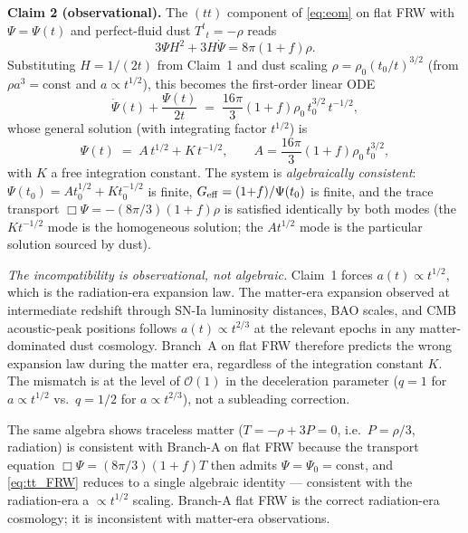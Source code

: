 \documentclass[aps,prd,twocolumn,nofootinbib,floatfix,superscriptaddress]{revtex4-2}
\begin{document}
\textbf{Claim 2 (observational).} The $(tt)$ component of
\eqref{eq:eom} on flat FRW with $\Psi = \Psi(t)$ and perfect-fluid
dust $T^t{}_t = -\rho$ reads
\begin{equation}
\label{eq:tt_FRW}
3\Psi H^2 + 3H\dot\Psi = 8\pi(1+f)\rho.
\end{equation}
Substituting $H = 1/(2t)$ from Claim~1 and dust scaling
$\rho = \rho_0(t_0/t)^{3/2}$ (from $\rho a^3 = \mathrm{const}$ and
$a\propto t^{1/2}$), this becomes the first-order linear ODE
\begin{equation}
\label{eq:psi_ode}
\dot\Psi(t) + \frac{\Psi(t)}{2t} \;=\; \frac{16\pi}{3}(1{+}f)\rho_0\,t_0^{3/2}\,t^{-1/2},
\end{equation}
whose general solution (with integrating factor $t^{1/2}$) is
\begin{equation}
\label{eq:psi_general}
\Psi(t) \;=\; A\,t^{1/2} + K\,t^{-1/2},
\qquad
A = \frac{16\pi}{3}(1{+}f)\rho_0\,t_0^{3/2},
\end{equation}
with $K$ a free integration constant. The system is
\emph{algebraically consistent}: $\Psi(t_0) = At_0^{1/2} + Kt_0^{-1/2}$
is finite, $G_{\rm eff} = (1{+}f)/\Psi(t_0)$ is finite, and the
trace transport $\Box\Psi = -(8\pi/3)(1{+}f)\rho$ is satisfied
identically by both modes (the $K t^{-1/2}$ mode is the
homogeneous solution; the $A t^{1/2}$ mode is the particular
solution sourced by dust).

\emph{The incompatibility is observational, not algebraic.}
Claim~1 forces $a(t) \propto t^{1/2}$, which is the radiation-era
expansion law. The matter-era expansion observed at intermediate
redshift through SN-Ia luminosity distances, BAO scales, and CMB
acoustic-peak positions follows $a(t) \propto t^{2/3}$ at the
relevant epochs in any matter-dominated dust cosmology. Branch~A on
flat FRW therefore predicts the wrong expansion law during the
matter era, regardless of the integration constant $K$. The
mismatch is at the level of $\mathcal O(1)$ in the deceleration
parameter ($q = 1$ for $a\propto t^{1/2}$ vs.\ $q = 1/2$ for
$a\propto t^{2/3}$), not a subleading correction.

The same algebra shows traceless matter ($T = -\rho + 3P = 0$,
i.e.\ $P = \rho/3$, radiation) is consistent with Branch-A on flat
FRW because the transport equation $\Box\Psi = (8\pi/3)(1+f)T$ then
admits $\Psi = \Psi_0 = \mathrm{const}$, and \eqref{eq:tt_FRW}
reduces to a single algebraic identity --- consistent with the
radiation-era a $\propto t^{1/2}$ scaling. Branch-A flat FRW is the
correct radiation-era cosmology; it is inconsistent with matter-era
observations.
\end{document}
